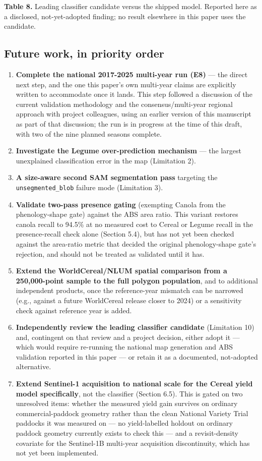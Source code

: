 \textbf{Table 8.} Leading classifier candidate versus the shipped model. Reported here as a disclosed, not-yet-adopted finding; no result elsewhere in this paper uses the candidate.

\subsection{Future work, in priority order}\label{future-work-in-priority-order}

\begin{enumerate}
\def\labelenumi{\arabic{enumi}.}
\tightlist
\item
  \textbf{Complete the national 2017-2025 multi-year run (E8)} --- the direct next step, and the one this paper's own multi-year claims are explicitly written to accommodate once it lands. This step followed a discussion of the current validation methodology and the consensus/multi-year regional approach with project colleagues, using an earlier version of this manuscript as part of that discussion; the run is in progress at the time of this draft, with two of the nine planned seasons complete.
\item
  \textbf{Investigate the Legume over-prediction mechanism} --- the largest unexplained classification error in the map (Limitation 2).
\item
  \textbf{A size-aware second SAM segmentation pass} targeting the \texttt{unsegmented\_blob} failure mode (Limitation 3).
\item
  \textbf{Validate two-pass presence gating} (exempting Canola from the phenology-shape gate) against the ABS area ratio. This variant restores canola recall to 94.5\% at no measured cost to Cereal or Legume recall in the presence-recall check alone (Section 5.4), but has not yet been checked against the area-ratio metric that decided the original phenology-shape gate's rejection, and should not be treated as validated until it has.
\item
  \textbf{Extend the WorldCereal/NLUM spatial comparison from a 250,000-point sample to the full polygon population}, and to additional independent products, once the reference-year mismatch can be narrowed (e.g., against a future WorldCereal release closer to 2024) or a sensitivity check against reference year is added.
\item
  \textbf{Independently review the leading classifier candidate} (Limitation 10) and, contingent on that review and a project decision, either adopt it --- which would require re-running the national map generation and ABS validation reported in this paper --- or retain it as a documented, not-adopted alternative.
\item
  \textbf{Extend Sentinel-1 acquisition to national scale for the Cereal yield model specifically}, not the classifier (Section 6.5). This is gated on two unresolved items: whether the measured yield gain survives on ordinary commercial-paddock geometry rather than the clean National Variety Trial paddocks it was measured on --- no yield-labelled holdout on ordinary paddock geometry currently exists to check this --- and a revisit-density covariate for the Sentinel-1B multi-year acquisition discontinuity, which has not yet been implemented.
\end{enumerate}
